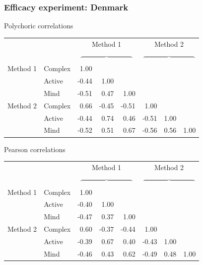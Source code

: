 \documentclass{beamer}
\begin{document}
\begin{frame}
\frametitle{Efficacy experiment: Denmark}

Polychoric correlations

\begin{footnotesize}
\begin{tabular}{llrrrrrr}
 \hline
 &&\multicolumn{3}{c}{Method 1} & \multicolumn{3}{c}{Method 2}\\
 &&\multicolumn{3}{c}{$\overbrace{\hspace{90pt}}$} & \multicolumn{3}{c}{$\overbrace{\hspace{90pt}}$}\\
Method 1	& Complex 	& 1.00 &  &  &  &  & \\
			& Active 	& -0.44 & 1.00 &  &  &  & \\
			& Mind 		& -0.51 & 0.47 & 1.00 &  &  & \\
Method 2	& Complex 	& 0.66 & -0.45 & -0.51 & 1.00 &  & \\
			& Active 	& -0.44 & 0.74 & 0.46 & -0.51 & 1.00 & \\
			& Mind 		& -0.52 & 0.51 & 0.67 & -0.56 & 0.56 & 1.00\\
 \hline
 \end{tabular} 
 \end{footnotesize}

Pearson correlations

\begin{footnotesize}\begin{tabular}{llrrrrrr}
 \hline
 &&\multicolumn{3}{c}{Method 1} & \multicolumn{3}{c}{Method 2}\\

 &&\multicolumn{3}{c}{$\overbrace{\hspace{90pt}}$} & \multicolumn{3}{c}{$\overbrace{\hspace{90pt}}$}\\
Method 1	& Complex 	&  1.00 &  &  &  &  & \\
			& Active 	& -0.40 & 1.00 &  &  &  & \\
			& Mind 		& -0.47 & 0.37 & 1.00 &  &  & \\
Method 2	& Complex 	&  0.60 & -0.37 & -0.44 & 1.00 &  & \\
			& Active 	& -0.39 & 0.67 & 0.40 & -0.43 & 1.00 & \\
			& Mind 		& -0.46 & 0.43 & 0.62 & -0.49 & 0.48 & 1.00\\
 \hline
 \end{tabular} \end{footnotesize}
\end{frame}
\end{document}
